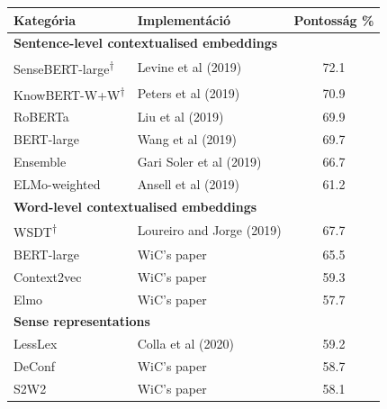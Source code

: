 \documentclass[12pt]{report}
\begin{document}
    \begin{table}[h]
        \centering
        \begin{tabular}{l l c}
            \toprule
            \textbf{Kategória}                 & \textbf{Implementáció}    & \textbf{Pontosság \%} \\
            \midrule
            \multicolumn{3}{l}{\textbf{Sentence-level contextualised embeddings}} \\
            SenseBERT-large\textsuperscript{†} & Levine et al (2019)       & 72.1                  \\
            KnowBERT-W+W\textsuperscript{†}    & Peters et al (2019)       & 70.9                  \\
            RoBERTa                            & Liu et al (2019)          & 69.9                  \\
            BERT-large                         & Wang et al (2019)         & 69.7                  \\
            Ensemble                           & Gari Soler et al (2019)   & 66.7                  \\
            ELMo-weighted                      & Ansell et al (2019)       & 61.2                  \\
            \midrule
            \multicolumn{3}{l}{\textbf{Word-level contextualised embeddings}} \\
            WSDT\textsuperscript{†}            & Loureiro and Jorge (2019) & 67.7                  \\
            BERT-large                         & WiC's paper               & 65.5                  \\
            Context2vec                        & WiC's paper               & 59.3                  \\
            Elmo                               & WiC's paper               & 57.7                  \\
            \midrule
            \multicolumn{3}{l}{\textbf{Sense representations}} \\
            LessLex                            & Colla et al (2020)        & 59.2                  \\
            DeConf                             & WiC's paper               & 58.7                  \\
            S2W2                               & WiC's paper               & 58.1                  \\

\end{tabular}
\end{table}
\end{document}
